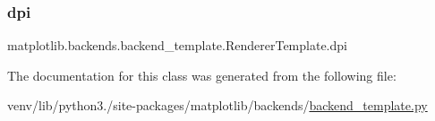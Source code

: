 \subsubsection{\texorpdfstring{dpi}{dpi}}
{\footnotesize\ttfamily matplotlib.\+backends.\+backend\+\_\+template.\+Renderer\+Template.\+dpi}



The documentation for this class was generated from the following file\+:\begin{DoxyCompactItemize}
\item 
venv/lib/python3./site-\/packages/matplotlib/backends/\hyperlink{backend__template_8py}{backend\+\_\+template.\+py}\end{DoxyCompactItemize}
